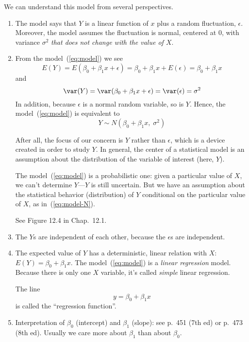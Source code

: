 \documentclass[12pt]{article}
\begin{document}
We can understand this model from several perspectives.
\begin{enumerate}

\item
The model says that $Y$ is a linear function of $x$ plus
a random fluctuation, $\epsilon$.
Moreover, the model assumes
the fluctuation is normal, centered at 0,
with variance $\sigma^2$ \emph{that does not change with the value of
$X$}.

\item
From the model~(\ref{eq:model}) we see
\[
E(Y) = E(\beta_0 + \beta_1 x + \epsilon)
    = \beta_0 + \beta_1 x + E(\epsilon)
    = \beta_0 + \beta_1 x
\]
and
\[
\var(Y) = \var(\beta_0 + \beta_1 x + \epsilon)
        = \var(\epsilon)
        = \sigma^2
\]
In addition, because $\epsilon$ is a normal random variable,
so is $Y$.
Hence,
the model~(\ref{eq:model}) is equivalent to
\begin{equation}\label{eq:model-N}
Y \sim N(\beta_0 + \beta_1 x,\; \sigma^2)
\end{equation}

After all, the focus of our concern is $Y$ rather than $\epsilon$,
which is a device created in order to study $Y$.
In general, the center of a statistical model
is an assumption about the distribution of the variable of interest
(here, $Y$).

The model~(\ref{eq:model}) is a probabilistic one:
given a particular value of $X$, we can't determine $Y$---$Y$ is still
uncertain. But we have an assumption about the statistical behavior
(\ie distribution) of $Y$ conditional on the particular value of $X$,
as in~(\ref{eq:model-N}).

See Figure 12.4 in Chap.~12.1.

\item
The $Y$s are independent of each other,
because the $\epsilon$s are independent.

\item
The expected value of $Y$ has a deterministic, linear relation with $X$:
$E(Y) = \beta_0 + \beta_1 x$.
The model~(\ref{eq:model}) is a \emph{linear regression} model.
Because there is only one $X$ variable,
it's called \emph{simple} linear regression.

The line
\[
y = \beta_0 + \beta_1x
\]
is called the ``regression function''.

\item
Interpretation of $\beta_0$ (intercept)
and $\beta_1$ (slope):
see p.~451 (7th ed) or p.~473 (8th ed).
Usually we care more about $\beta_1$ than about $\beta_0$.
\end{enumerate}
\end{document}
